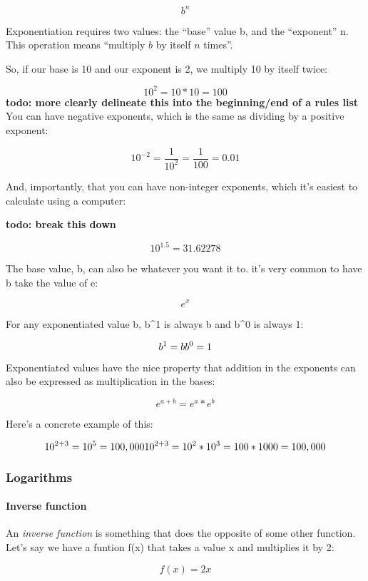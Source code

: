 \documentclass[]{article}
\let\oldparagraph\paragraph
\renewcommand{\paragraph}[1]{\oldparagraph{#1}\mbox{}}
\begin{document}
\[ b^n \]

Exponentiation requires two values: the ``base'' value b, and the
``exponent'' n. This operation means ``multiply \(b\) by itself \(n\)
times''.

So, if our base is 10 and our exponent is 2, we multiply 10 by itself
twice:

\[ 10^2 = 10*10 = 100 \] \textbf{todo: more clearly delineate this into
the beginning/end of a rules list} You can have negative exponents,
which is the same as dividing by a positive exponent:

\[ 10^{-2}=\frac{1}{10^2} = \frac{1}{100} = 0.01 \]

And, importantly, that you can have non-integer exponents, which it's
easiest to calculate using a computer:

\textbf{todo: break this down}

\[ 10^{1.5} = 31.62278\]

The base value, b, can also be whatever you want it to. it's very common
to have b take the value of e:

\[ e^x \]

For any exponentiated value b, b\^{}1 is always b and b\^{}0 is always
1:

\[ b^1=b \\b^0 = 1 \]

Exponentiated values have the nice property that addition in the
exponents can also be expressed as multiplication in the bases:

\[ e^{a + b} = e^a * e^b \]

Here's a concrete example of this:

\[ 10^{2+3} = 10^5 =  100,000 \\ 10^{2+3} = 10^2 * 10^3 = 100 * 1000 = 100,000 \]

\subsubsection{Logarithms}\label{logarithms}

\paragraph{Inverse function}\label{inverse-function}

An \emph{inverse function} is something that does the opposite of some
other function. Let's say we have a funtion f(x) that takes a value x
and multiplies it by 2:

\[ f(x) = 2x \]
\end{document}
